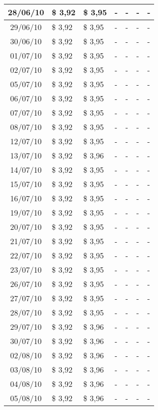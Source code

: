 \begin{center}
\begin{longtable}{|c|p{1.5cm}|p{1.5cm}|p{1.5cm}|p{1.5cm}|p{1.5cm}|p{1.5cm}|}
28/06/10 & \$ 3,92 & \$ 3,95 & - & - & - & - \\ \hline
29/06/10 & \$ 3,92 & \$ 3,95 & - & - & - & - \\ \hline
30/06/10 & \$ 3,92 & \$ 3,95 & - & - & - & - \\ \hline
01/07/10 & \$ 3,92 & \$ 3,95 & - & - & - & - \\ \hline
02/07/10 & \$ 3,92 & \$ 3,95 & - & - & - & - \\ \hline
05/07/10 & \$ 3,92 & \$ 3,95 & - & - & - & - \\ \hline
06/07/10 & \$ 3,92 & \$ 3,95 & - & - & - & - \\ \hline
07/07/10 & \$ 3,92 & \$ 3,95 & - & - & - & - \\ \hline
08/07/10 & \$ 3,92 & \$ 3,95 & - & - & - & - \\ \hline
12/07/10 & \$ 3,92 & \$ 3,95 & - & - & - & - \\ \hline
13/07/10 & \$ 3,92 & \$ 3,96 & - & - & - & - \\ \hline
14/07/10 & \$ 3,92 & \$ 3,95 & - & - & - & - \\ \hline
15/07/10 & \$ 3,92 & \$ 3,95 & - & - & - & - \\ \hline
16/07/10 & \$ 3,92 & \$ 3,95 & - & - & - & - \\ \hline
19/07/10 & \$ 3,92 & \$ 3,95 & - & - & - & - \\ \hline
20/07/10 & \$ 3,92 & \$ 3,95 & - & - & - & - \\ \hline
21/07/10 & \$ 3,92 & \$ 3,95 & - & - & - & - \\ \hline
22/07/10 & \$ 3,92 & \$ 3,95 & - & - & - & - \\ \hline
23/07/10 & \$ 3,92 & \$ 3,95 & - & - & - & - \\ \hline
26/07/10 & \$ 3,92 & \$ 3,95 & - & - & - & - \\ \hline
27/07/10 & \$ 3,92 & \$ 3,95 & - & - & - & - \\ \hline
28/07/10 & \$ 3,92 & \$ 3,95 & - & - & - & - \\ \hline
29/07/10 & \$ 3,92 & \$ 3,96 & - & - & - & - \\ \hline
30/07/10 & \$ 3,92 & \$ 3,96 & - & - & - & - \\ \hline
02/08/10 & \$ 3,92 & \$ 3,96 & - & - & - & - \\ \hline
03/08/10 & \$ 3,92 & \$ 3,96 & - & - & - & - \\ \hline
04/08/10 & \$ 3,92 & \$ 3,96 & - & - & - & - \\ \hline
05/08/10 & \$ 3,92 & \$ 3,96 & - & - & - & - \\ \hline

\end{longtable}
\end{center}
